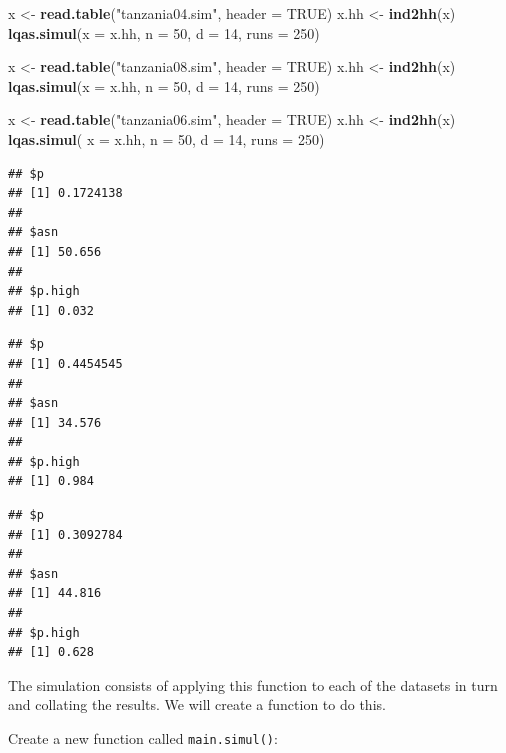 \documentclass[12pt,a4paper]{book}
\newenvironment{Shaded}{\begin{snugshade}}{\end{snugshade}}
\newcommand{\KeywordTok}[1]{\textcolor[rgb]{0.13,0.29,0.53}{\textbf{#1}}}
\newcommand{\DataTypeTok}[1]{\textcolor[rgb]{0.13,0.29,0.53}{#1}}
\newcommand{\DecValTok}[1]{\textcolor[rgb]{0.00,0.00,0.81}{#1}}
\newcommand{\StringTok}[1]{\textcolor[rgb]{0.31,0.60,0.02}{#1}}
\newcommand{\OtherTok}[1]{\textcolor[rgb]{0.56,0.35,0.01}{#1}}
\newcommand{\NormalTok}[1]{#1}
\theoremstyle{definition}
\theoremstyle{definition}
\theoremstyle{definition}
\theoremstyle{remark}
\begin{document}
\begin{Shaded}
\begin{Highlighting}[]
\NormalTok{x <-}\StringTok{ }\KeywordTok{read.table}\NormalTok{(}\StringTok{"tanzania04.sim"}\NormalTok{, }\DataTypeTok{header =} \OtherTok{TRUE}\NormalTok{)}
\NormalTok{x.hh <-}\StringTok{ }\KeywordTok{ind2hh}\NormalTok{(x)}
\KeywordTok{lqas.simul}\NormalTok{(}\DataTypeTok{x =}\NormalTok{ x.hh, }\DataTypeTok{n =} \DecValTok{50}\NormalTok{, }\DataTypeTok{d =} \DecValTok{14}\NormalTok{, }\DataTypeTok{runs =} \DecValTok{250}\NormalTok{)}

\NormalTok{x <-}\StringTok{ }\KeywordTok{read.table}\NormalTok{(}\StringTok{"tanzania08.sim"}\NormalTok{, }\DataTypeTok{header =} \OtherTok{TRUE}\NormalTok{)}
\NormalTok{x.hh <-}\StringTok{ }\KeywordTok{ind2hh}\NormalTok{(x)}
\KeywordTok{lqas.simul}\NormalTok{(}\DataTypeTok{x =}\NormalTok{ x.hh, }\DataTypeTok{n =} \DecValTok{50}\NormalTok{, }\DataTypeTok{d =} \DecValTok{14}\NormalTok{, }\DataTypeTok{runs =} \DecValTok{250}\NormalTok{)}

\NormalTok{x <-}\StringTok{ }\KeywordTok{read.table}\NormalTok{(}\StringTok{"tanzania06.sim"}\NormalTok{, }\DataTypeTok{header =} \OtherTok{TRUE}\NormalTok{)}
\NormalTok{x.hh <-}\StringTok{ }\KeywordTok{ind2hh}\NormalTok{(x)}
\KeywordTok{lqas.simul}\NormalTok{( }\DataTypeTok{x =}\NormalTok{ x.hh, }\DataTypeTok{n =} \DecValTok{50}\NormalTok{, }\DataTypeTok{d =} \DecValTok{14}\NormalTok{, }\DataTypeTok{runs =} \DecValTok{250}\NormalTok{)}
\end{Highlighting}
\end{Shaded}

\begin{verbatim}
## $p
## [1] 0.1724138
## 
## $asn
## [1] 50.656
## 
## $p.high
## [1] 0.032
\end{verbatim}

\begin{verbatim}
## $p
## [1] 0.4454545
## 
## $asn
## [1] 34.576
## 
## $p.high
## [1] 0.984
\end{verbatim}

\begin{verbatim}
## $p
## [1] 0.3092784
## 
## $asn
## [1] 44.816
## 
## $p.high
## [1] 0.628
\end{verbatim}

The simulation consists of applying this function to each of the
datasets in turn and collating the results. We will create a function to
do this.

Create a new function called \texttt{main.simul()}:
\end{document}
